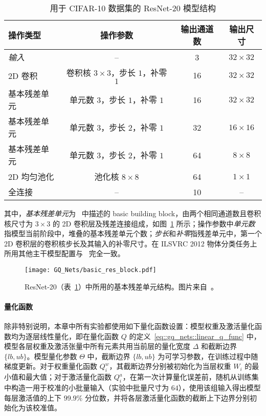 \begin{table}[htb]
  \centering
  \caption{用于 CIFAR-10 数据集的 ResNet-20 模型结构}
  \label{tab::gq_nets::res20}
  \begin{tabular}{l*{3}{c}}
    \toprule
    操作类型 & 操作参数 & 输出通道数 & 输出尺寸 \\
    \midrule
    \emph{输入} & -- & 3 & $32\times32$ \\
    2D 卷积 & 卷积核 $3\times 3$，步长 $1$，补零 $1$ & 16 & $32\times 32$ \\
    基本残差单元 & 单元数 $3$，步长 $1$，补零 $1$ & 16 & $32\times 32$ \\
    基本残差单元 & 单元数 $3$，步长 $2$，补零 $1$ & 32 & $16\times 16$ \\
    基本残差单元 & 单元数 $3$，步长 $2$，补零 $1$ & 64 & $8\times 8$ \\
    2D 均匀池化 & 池化核 $8\times 8$ & 64 & $1\times 1$ \\
    全连接 & -- & 10 & -- \\
    \bottomrule
  \end{tabular}
\end{table}

其中，\emph{基本残差单元}为~\citet{He_2016} 中描述的 basic building block，由两个相同通道数且卷积核尺寸为 $3\times 3$ 的 2D 卷积层及残差连接组成，如图~\ref{img::gq_nets::basic_res_block} 所示；操作参数中\emph{单元数}指模型当前阶段中，堆叠的基本残差单元个数；\emph{步长}和\emph{补零}指残差单元中，第一个 2D 卷积层的卷积核步长及其输入的补零尺寸。在 ILSVRC 2012 物体分类任务上所用其他主干模型配置与~\citet{He_2016,howard2017mobilenets,Sandler_2018} 完全一致。

\begin{figure}[htb]
  \centering
  \texttt{[image: GQ\_Nets/basic\_res\_block.pdf]}
  \caption{ResNet-20（表~\ref{tab::gq_nets::res20}）中所用的基本残差单元结构。图片来自~\citet{He_2016}。}
  \label{img::gq_nets::basic_res_block}
\end{figure}

\paragraph{量化函数}
除非特别说明，本章中所有实验都使用如下量化函数设置：模型权重及激活量化函数均为逐层线性量化，即在量化函数 $Q$ 的定义~\eqref{eq::gq_nets::linear_q_func} 中，模型各层权重及激活张量中所有元素共用当前层的量化宽度 $\Delta$ 和截断边界 $\{lb, ub\}$。模型量化参数 $\Theta$ 中，截断边界 $\{lb, ub\}$ 为可学习参数，在训练过程中随梯度更新。对于权重量化函数 $Q^w_i$，其截断边界分别被初始化为当层权重 $W_i$ 的最小值和最大值；对于激活量化函数 $Q^a_i$，在第一次计算量化误差前，随机从训练集中构造一用于校准的小批量输入（实验中批量尺寸为 $64$），使用该组输入得出模型每层激活值的上下 $99.9\%$ 分位数，并将各层激活量化函数的截断上下边界分别初始化为该校准值。
